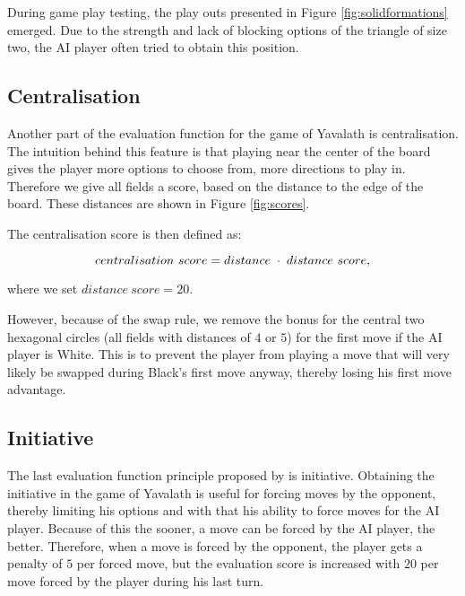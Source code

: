 \documentclass[11pt]{article}
\begin{document}
During game play testing, the play outs presented in Figure \ref{fig:solidformations} emerged. Due to the strength and lack of blocking options of the triangle of size two, the AI player often tried to obtain this position.

\subsection{Centralisation}
\label{-subsec:centralisation}
Another part of the evaluation function for the game of Yavalath is centralisation. The intuition behind this feature is that playing near the center of the board gives the player more options to choose from, \ie more directions to play in. Therefore we give all fields a score, based on the distance to the edge of the board. These distances are shown in Figure \ref{fig:scores}. 



The centralisation score is then defined as:

\begin{equation}
	centralisation\ score = distance \;\cdot\; distance\ score,
\end{equation}

where we set $distance\ score = 20$.

However, because of the swap rule, we remove the bonus for the central two hexagonal circles (all fields with distances of $4$ or $5$) for the first move if the AI player is White. This is to prevent the player from playing a move that will very likely be swapped during Black's first move anyway, thereby losing his first move advantage.

\subsection{Initiative}
\label{-subsec:initiative}
The last evaluation function principle proposed by \cite{Winands2004} is initiative. Obtaining the initiative in the game of Yavalath is useful for forcing moves by the opponent, thereby limiting his options and with that his ability to force moves for the AI player. Because of this the sooner, a move can be forced by the AI player, the better. Therefore, when a move is forced by the opponent, the player gets a penalty of $5$ per forced move, but the evaluation score is increased with $20$ per move forced by the player during his last turn.
\end{document}
